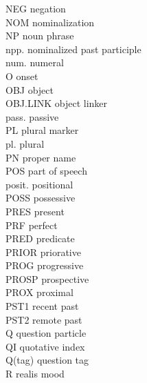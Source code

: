 \begin{multicols}{2}
NEG  \hfill negation    \\
NOM  \hfill nominalization    \\
NP  \hfill noun phrase   \\
npp.  \hfill nominalized past participle   \\
num. \hfill numeral \\
O  \hfill onset   \\
OBJ \hfill object \\
OBJ.LINK \hfill object linker \\
pass. \hfill passive \\
PL  \hfill plural marker    \\
pl. \hfill plural \\
PN  \hfill proper name    \\
POS \hfill part of speech \\
posit. \hfill positional \\
POSS \hfill possessive    \\
PRES \hfill present    \\
PRF \hfill perfect \\
PRED \hfill predicate \\
PRIOR \hfill priorative \\
PROG \hfill progressive    \\
PROSP \hfill prospective \\
PROX \hfill proximal    \\
PST1  \hfill recent past   \\
PST2  \hfill remote past    \\
Q  \hfill question particle    \\
QI \hfill quotative index \\
Q(tag) \hfill question tag \\
R \hfill realis mood \\


\end{multicols}
